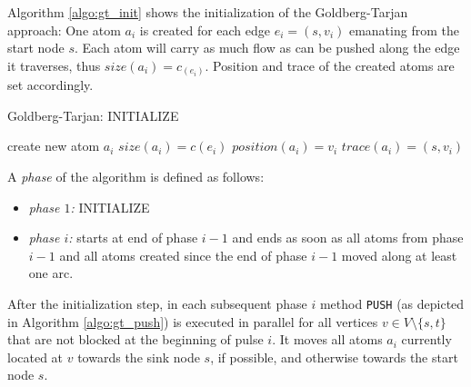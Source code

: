 \documentclass[a4paper,10pt, twocolumn]{article}
\begin{document}
Algorithm \ref{algo:gt_init} shows the initialization of the Goldberg-Tarjan approach: One atom $a_i$ is created for each edge $e_i=(s, v_i)$ emanating from the start node $s$. Each atom will carry as much flow as can be pushed along the edge  it traverses, thus $size(a_i) = c_(e_i)$. Position and trace of the created atoms are set accordingly.

\begin{algorithm}
\caption{Goldberg-Tarjan: INITIALIZE}
\label{algo:gt_init}
\begin{algorithmic}[1]
		\State create new atom $a_i$
		\State $size(a_i) = c(e_i)$
		\State $position(a_i) = v_i$
		\State $trace(a_i) = (s,v_i)$		
	\EndFor
	\EndFunction
\end{algorithmic}
\end{algorithm}

A \emph{phase} of the algorithm is defined as follows:
\begin{itemize}
	\item \textit{phase $1$:} INITIALIZE
	\item \textit{phase $i$:} starts at end of phase $i-1$ and ends as soon as all atoms from phase $i-1$ and all atoms created since the end of phase $i-1$ moved along at least one arc.
\end{itemize}		

After the initialization step, in each subsequent phase $i$ method \lstinline|PUSH| (as depicted in Algorithm \ref{algo:gt_push}) is executed in parallel for all vertices $v \in V \setminus \{s,t\}$ that are not blocked at the beginning of pulse $i$. It moves all atoms $a_i$ currently located at $v$ towards the sink node $s$, if possible, and otherwise towards the start node $s$.
\end{document}
